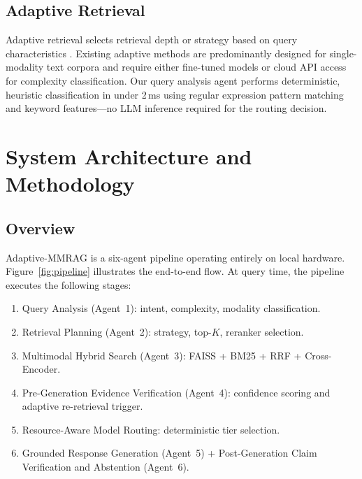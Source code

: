 \documentclass[conference]{IEEEtran}
\begin{document}
\subsection{Adaptive Retrieval}
Adaptive retrieval selects retrieval depth or strategy based on query
characteristics \cite{mallen2023not, asai2024selfrag}. Existing adaptive
methods are predominantly designed for single-modality text corpora and
require either fine-tuned models or cloud API access for complexity
classification. Our query analysis agent performs deterministic, heuristic
classification in under 2\,ms using regular expression pattern matching and
keyword features—no LLM inference required for the routing decision.

\section{System Architecture and Methodology}\label{sec:methodology}

\subsection{Overview}

Adaptive-MMRAG is a six-agent pipeline operating entirely on local hardware.
Figure~\ref{fig:pipeline} illustrates the end-to-end flow. At query time, the
pipeline executes the following stages:

\begin{enumerate}
  \item Query Analysis (Agent~1): intent, complexity, modality classification.
  \item Retrieval Planning (Agent~2): strategy, top-$K$, reranker selection.
  \item Multimodal Hybrid Search (Agent~3): FAISS + BM25 + RRF + Cross-Encoder.
  \item Pre-Generation Evidence Verification (Agent~4): confidence scoring
        and adaptive re-retrieval trigger.
  \item Resource-Aware Model Routing: deterministic tier selection.
  \item Grounded Response Generation (Agent~5) + Post-Generation Claim
        Verification and Abstention (Agent~6).
\end{enumerate}
\end{document}
